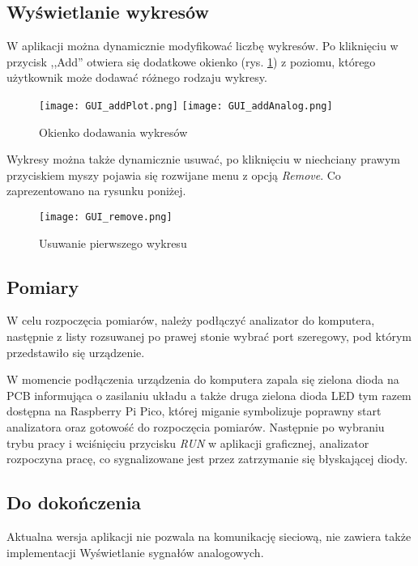    \subsection{Wyświetlanie wykresów}
        W aplikacji można dynamicznie modyfikować liczbę wykresów.
        Po kliknięciu w przycisk ,,Add'' otwiera się dodatkowe okienko (rys. \ref{fig:gui_addPlot}) z poziomu,
        którego użytkownik może dodawać różnego rodzaju wykresy.
        \begin{figure}[!ht]
            \centering
            \texttt{[image: GUI\_addPlot.png]}
            \texttt{[image: GUI\_addAnalog.png]}
            \caption{Okienko dodawania wykresów}
            \label{fig:gui_addPlot}
        \end{figure}

        Wykresy można także dynamicznie usuwać, po kliknięciu w niechciany prawym przyciskiem myszy pojawia się rozwijane menu z opcją \textit{Remove}.
        Co zaprezentowano na rysunku poniżej.

        \begin{figure}[!ht]
            \centering
            \texttt{[image: GUI\_remove.png]}
            \caption{Usuwanie pierwszego wykresu}
            \label{fig:gui_removePlot}
        \end{figure}

    
    \subsection{Pomiary}
        W celu rozpoczęcia pomiarów, należy podłączyć analizator do komputera, 
        następnie z listy rozsuwanej po prawej stonie wybrać port szeregowy,
        pod którym przedstawiło się urządzenie.

        W momencie podłączenia urządzenia do komputera zapala się zielona dioda na PCB informująca o zasilaniu układu a także
        druga zielona dioda LED tym razem dostępna na Raspberry Pi Pico, której miganie symbolizuje poprawny start analizatora oraz gotowość do rozpoczęcia pomiarów.
        Następnie po wybraniu trybu pracy i wciśnięciu przycisku \textit{RUN} w aplikacji graficznej, analizator rozpoczyna pracę,
        co sygnalizowane jest przez zatrzymanie się błyskającej diody.
    
    \subsection{Do dokończenia}
        Aktualna wersja aplikacji nie pozwala na komunikację sieciową, nie zawiera także implementacji Wyświetlanie sygnałów analogowych.

